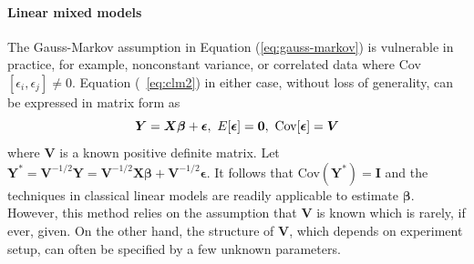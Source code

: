 \paragraph{Linear mixed models}\label{para:lmm}
The Gauss-Markov assumption in Equation (\ref{eq:gauss-markov}) is vulnerable in practice, for
example, nonconstant variance, or correlated data where Cov$[\epsilon_i, \epsilon_j]\neq 0$.
Equation (~\ref{eq:clm2}) in either case, without loss of generality, can be expressed in matrix
form as
\begin{equation}\label{eq:clm3}
	\bm Y = \bm {X\beta} + \bm \epsilon, ~ E[\bm \epsilon] = \bm 0, ~\text{Cov}[\bm\epsilon] = \bm V
\end{equation}
where $\bm V$ is a known positive definite matrix. Let $\bm Y^{\ast} = \bm V^{-1/2}\bm Y = \bm
V^{-1/2}\bm {X\beta} + \bm V^{-1/2}\bm \epsilon$. It follows that Cov$(\bm Y^{\ast})= \bm I$ and the
techniques in classical linear models are readily applicable to estimate $\bm \beta$. However, this
method relies on the assumption that $\bm V$ is known which is rarely, if ever, given. On the other
hand, the structure of $\bm V$, which depends on experiment setup, can often be specified by a few
unknown parameters. 


